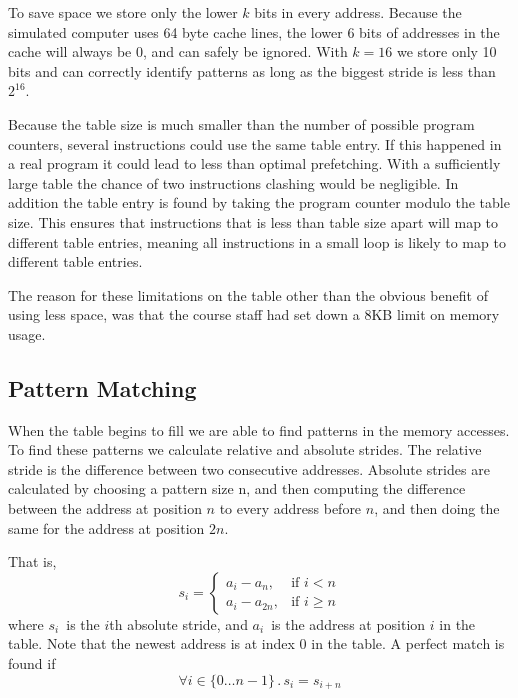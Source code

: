 To save space we store only the lower $k$ bits in every address. Because the
simulated computer uses 64 byte cache lines, the lower 6 bits of addresses in
the cache will always be 0, and can safely be ignored. With $k=16$ we store
only 10 bits and can correctly identify patterns as long as the biggest stride
is less than $2^{16}$.

Because the table size is much smaller
than the number of possible program counters, several instructions could use
the same table entry. If this happened in a real program it could lead to less
than optimal prefetching. With a sufficiently large table the chance of two
instructions clashing would be negligible. In addition the table entry is found
by taking the program counter modulo the table size. This ensures that
instructions that is less than table size apart will map to different table
entries, meaning all instructions in a small loop is likely to map to different table entries.

The reason for these limitations on the table other than the obvious benefit of using less space, was that the course staff had set down a 8KB limit on memory usage.

\subsection{Pattern Matching}

When the table begins to fill we are able to find patterns in the memory accesses.
To find these patterns we calculate relative and absolute strides.
The relative stride is the difference between two consecutive
addresses. Absolute strides are calculated by choosing a pattern size n,
and then computing the difference between the address at position
$n$ to every address before $n$, and then doing the same for the address
at position $2n$.

That is,
\[
	s_i = \begin{cases}
		a_i - a_n,    & \text{if } i  < n \\%
		a_i - a_{2n}, & \text{if } i \geq n %
	\end{cases}
\]
where $s_i$~is the $i$th absolute stride, and $a_i$~is the address at position
$i$ in the table. Note that the newest address is at index 0 in the table. A
perfect match is found if
\begin{equation}
\label{eq:match}
\forall i \in \{0 \dots n - 1\} \,.\, s_i = s_{i + n}
\end{equation}

